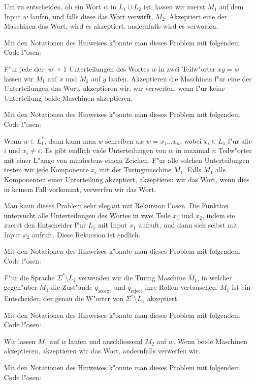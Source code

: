 \begin{loesung}
\begin{teilaufgaben}
\item Um zu entscheiden, ob ein Wort $w$ in $L_1\cup L_2$ ist,
lassen wir zuerst $M_1$ auf dem Input $w$ laufen, und falls
diese das Wort verwirft, $M_2$. Akzeptiert eine der Maschinen
das Wort, wird es akzeptiert, andernfalls wird es verworfen.

Mit den Notationen des Hinweises k"onnte man dieses Problem mit folgendem
Code l"osen:
\item
F"ur jede der $|w|+1$ Unterteilungen des Wortes $w$ in zwei
Teilw"orter $xy=w$ lassen wir $M_1$ auf $x$ und $M_2$ auf
$y$ laufen. Akzeptieren die Maschinen f"ur eine der
Unterteilungen das Wort, akzeptieren wir, wir verwerfen, wenn
f"ur keine Unterteilung beide Maschinen akzeptieren.

Mit den Notationen des Hinweises k"onnte man dieses Problem mit folgendem
Code l"osen:
\item
Wenn $w\in L_1^*$, dann kann man $w$ schreiben als
$w=x_1\dots x_n$, wobei $x_i\in L_1$ f"ur alle $i$ und
$x_i\ne \varepsilon$.
Es gibt endlich viele Unterteilungen von $w$ in maximal $n$ Teilw"orter
mit einer L"ange von mindestens einem Zeichen.
F"ur alle solchen Unterteilungen testen wir jede Komponente $x_i$ mit der
Turingmaschine $M_1$.
Falls $M_1$ alle Komponenten einer Unterteilung
akzeptiert, akzeptieren wir das Wort, wenn dies in keinem Fall
vorkommt, verwerfen wir das Wort.

Man kann dieses Problem sehr elegant mit Rekursion l"osen.
Die Funktion untersucht alle Unterteilungen des Wortes in
zwei Teile $x_1$ und $x_2$, indem sie zuerst den Entscheider
f"ur $L_1$ mit Input $x_1$ aufruft, und dann sich selbst
mit Input $x_2$ aufruft. Diese Rekursion ist endlich.

Mit den Notationen des Hinweises k"onnte man dieses Problem mit folgendem
Code l"osen:
\item
F"ur die Sprache $\Sigma^*\setminus L_1$ verwenden wir die
Turing Maschine $\bar M_1$, in welcher gegen"uber $M_1$
die Zust"ande $q_{\text{accept}}$ und $q_{\text{reject}}$
ihre Rollen vertauschen. $\bar M_1$ ist ein Entscheider,
der genau die W"orter von $\Sigma^*\setminus L_1$ akzeptiert.

Mit den Notationen des Hinweises k"onnte man dieses Problem mit folgendem
Code l"osen:
\item
Wir lassen $M_1$ auf $w$ laufen und anschliessend $M_2$ auf $w$.
Wenn beide Maschinen akzeptieren, akzeptieren wir das Wort, andernfalls
verwerfen wir.

Mit den Notationen des Hinweises k"onnte man dieses Problem mit folgendem
Code l"osen:
\end{teilaufgaben}
\end{loesung}

